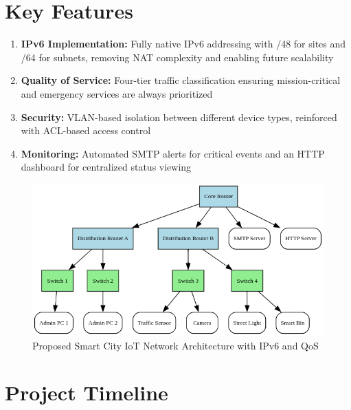 \documentclass[12pt,a4paper]{article}
\begin{document}
\section*{Key Features}
{}
\begin{enumerate}[label=5.\arabic*, nosep]
    \item \textbf{IPv6 Implementation:} Fully native IPv6 addressing with /48 for sites and /64 for subnets, removing NAT complexity and enabling future scalability
    \item \textbf{Quality of Service:} Four-tier traffic classification ensuring mission-critical and emergency services are always prioritized
    \item \textbf{Security:} VLAN-based isolation between different device types, reinforced with ACL-based access control
    \item \textbf{Monitoring:} Automated SMTP alerts for critical events and an HTTP dashboard for centralized status viewing
\end{enumerate}

\begin{figure}[h!]
    \centering
    \includegraphics[width=\textwidth]{graphviz.png}
    \caption{Proposed Smart City IoT Network Architecture with IPv6 and QoS}
    \label{fig:network-diagram}
\end{figure}

\section*{Project Timeline}
{}

\vspace{1em}
\renewcommand{\arraystretch}{1.2}
\setlength{\extrarowheight}{4pt}
\end{document}

